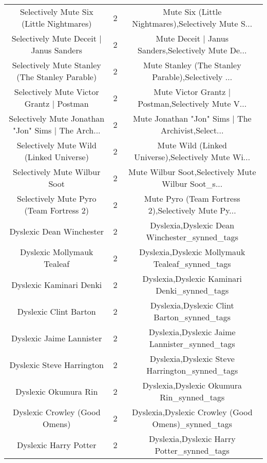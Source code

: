 \begin{table}[h!]
{\begin{tabular}{|c|c|c|}
          Selectively Mute Six (Little Nightmares) &          2 & Mute Six (Little Nightmares),Selectively Mute S... \\
           Selectively Mute Deceit | Janus Sanders &          2 & Mute Deceit | Janus Sanders,Selectively Mute De... \\
    Selectively Mute Stanley (The Stanley Parable) &          2 & Mute Stanley (The Stanley Parable),Selectively ... \\
          Selectively Mute Victor Grantz | Postman &          2 & Mute Victor Grantz | Postman,Selectively Mute V... \\
Selectively Mute Jonathan "Jon" Sims | The Arch... &          2 & Mute Jonathan "Jon" Sims | The Archivist,Select... \\
           Selectively Mute Wild (Linked Universe) &          2 & Mute Wild (Linked Universe),Selectively Mute Wi... \\
                      Selectively Mute Wilbur Soot &          2 & Mute Wilbur Soot,Selectively Mute Wilbur Soot\_s... \\
           Selectively Mute Pyro (Team Fortress 2) &          2 & Mute Pyro (Team Fortress 2),Selectively Mute Py... \\
                          Dyslexic Dean Winchester &          2 &      Dyslexia,Dyslexic Dean Winchester\_synned\_tags \\
                        Dyslexic Mollymauk Tealeaf &          2 &    Dyslexia,Dyslexic Mollymauk Tealeaf\_synned\_tags \\
                           Dyslexic Kaminari Denki &          2 &       Dyslexia,Dyslexic Kaminari Denki\_synned\_tags \\
                             Dyslexic Clint Barton &          2 &         Dyslexia,Dyslexic Clint Barton\_synned\_tags \\
                          Dyslexic Jaime Lannister &          2 &      Dyslexia,Dyslexic Jaime Lannister\_synned\_tags \\
                         Dyslexic Steve Harrington &          2 &     Dyslexia,Dyslexic Steve Harrington\_synned\_tags \\
                              Dyslexic Okumura Rin &          2 &          Dyslexia,Dyslexic Okumura Rin\_synned\_tags \\
                     Dyslexic Crowley (Good Omens) &          2 & Dyslexia,Dyslexic Crowley (Good Omens)\_synned\_tags \\
                             Dyslexic Harry Potter &          2 &         Dyslexia,Dyslexic Harry Potter\_synned\_tags \\

\end{tabular}}
\end{table}
